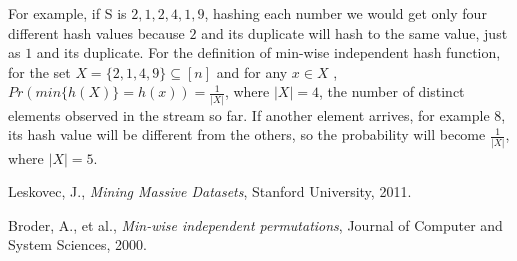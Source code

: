 \documentclass[]{report}
\begin{document}
For example, if S is $2,1,2,4,1,9$, hashing each number we would get only four different hash values because $2$ and its duplicate will hash to the same value, just as $1$ and its duplicate. For the definition of min-wise independent hash function, for the set $X = \{2,1,4,9\} \subseteq [n]$ and for any $x \in X$ , $Pr(min\{h(X)\} = h(x)) = \frac{1}{|X|}$, where $|X| = 4$, the number of distinct elements observed in the stream so far. If another element arrives, for example $8$, its hash value will be different from the others, so the probability will become $\frac{1}{|X|}$, where $|X| = 5$.
\clearpage

\begin{thebibliography}{9}
	Leskovec, J.,
	\textit{Mining Massive Datasets},
	Stanford University,
	2011.
	
	Broder, A., et al., 
	\textit{Min-wise independent permutations},
	Journal of Computer and System Sciences,
	2000.
\end{thebibliography}
\end{document}
